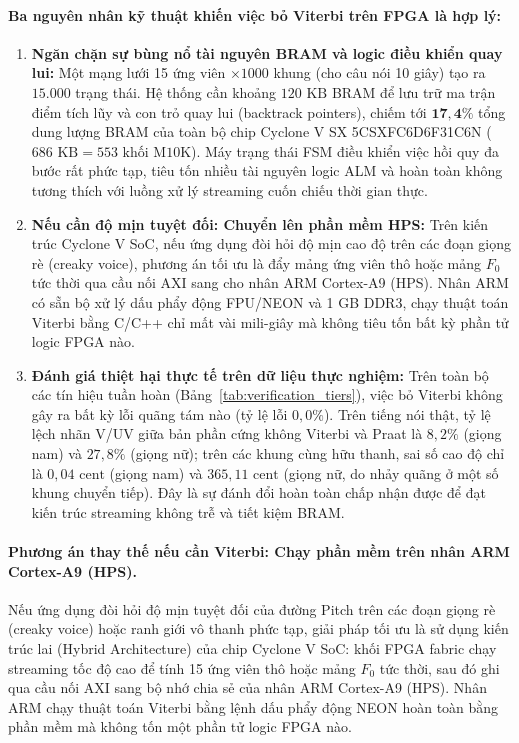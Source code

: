 \documentclass[11pt,a4paper]{article}
\begin{document}
\paragraph{Ba nguyên nhân kỹ thuật khiến việc bỏ Viterbi trên FPGA là hợp lý:}
\begin{enumerate}
    \setlength{\itemsep}{1.5pt}
    \item \textbf{Ngăn chặn sự bùng nổ tài nguyên BRAM và logic điều khiển quay lui:} Một mạng lưới 15 ứng viên $\times 1000$ khung (cho câu nói 10 giây) tạo ra $15.000$ trạng thái. Hệ thống cần khoảng $120\text{ KB}$ BRAM để lưu trữ ma trận điểm tích lũy và con trỏ quay lui (backtrack pointers), chiếm tới $\mathbf{17{,}4\%}$ tổng dung lượng BRAM của toàn bộ chip Cyclone V SX 5CSXFC6D6F31C6N ($686\text{ KB} = 553\text{ khối M10K}$). Máy trạng thái FSM điều khiển việc hồi quy đa bước rất phức tạp, tiêu tốn nhiều tài nguyên logic ALM và hoàn toàn không tương thích với luồng xử lý streaming cuốn chiếu thời gian thực.
    \item \textbf{Nếu cần độ mịn tuyệt đối: Chuyển lên phần mềm HPS:} Trên kiến trúc Cyclone V SoC, nếu ứng dụng đòi hỏi độ mịn cao độ trên các đoạn giọng rè (creaky voice), phương án tối ưu là đẩy mảng ứng viên thô hoặc mảng $F_0$ tức thời qua cầu nối AXI sang cho nhân ARM Cortex-A9 (HPS). Nhân ARM có sẵn bộ xử lý dấu phẩy động FPU/NEON và 1 GB DDR3, chạy thuật toán Viterbi bằng C/C++ chỉ mất vài mili-giây mà không tiêu tốn bất kỳ phần tử logic FPGA nào.
    \item \textbf{Đánh giá thiệt hại thực tế trên dữ liệu thực nghiệm:} Trên toàn bộ các tín hiệu tuần hoàn (Bảng~\ref{tab:verification_tiers}), việc bỏ Viterbi không gây ra bất kỳ lỗi quãng tám nào (tỷ lệ lỗi $0{,}0\%$). Trên tiếng nói thật, tỷ lệ lệch nhãn V/UV giữa bản phần cứng không Viterbi và Praat là $8{,}2\%$ (giọng nam) và $27{,}8\%$ (giọng nữ); trên các khung cùng hữu thanh, sai số cao độ chỉ là $0{,}04\text{ cent}$ (giọng nam) và $365{,}11\text{ cent}$ (giọng nữ, do nhảy quãng ở một số khung chuyển tiếp). Đây là sự đánh đổi hoàn toàn chấp nhận được để đạt kiến trúc streaming không trễ và tiết kiệm BRAM.
\end{enumerate}

\paragraph{Phương án thay thế nếu cần Viterbi: Chạy phần mềm trên nhân ARM Cortex-A9 (HPS).}
Nếu ứng dụng đòi hỏi độ mịn tuyệt đối của đường Pitch trên các đoạn giọng rè (creaky voice) hoặc ranh giới vô thanh phức tạp, giải pháp tối ưu là sử dụng kiến trúc lai (Hybrid Architecture) của chip Cyclone V SoC:
khối FPGA fabric chạy streaming tốc độ cao để tính 15 ứng viên thô hoặc mảng $F_0$ tức thời, sau đó ghi qua cầu nối AXI sang bộ nhớ chia sẻ của nhân ARM Cortex-A9 (HPS). Nhân ARM chạy thuật toán Viterbi bằng lệnh dấu phẩy động NEON hoàn toàn bằng phần mềm mà không tốn một phần tử logic FPGA nào.
\end{document}
